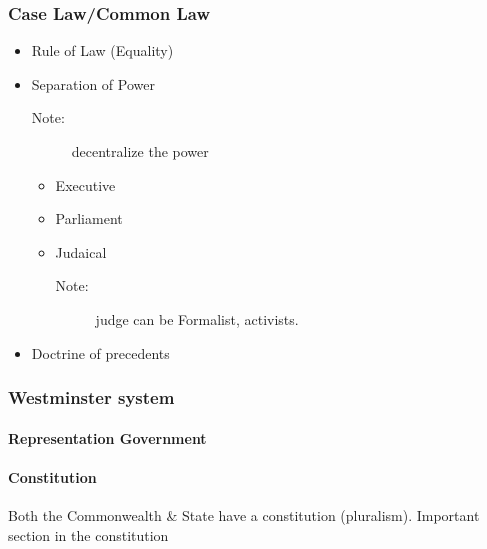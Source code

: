 \subsubsection{Case Law/Common Law}
\begin{itemize}
    \item Rule of Law (Equality)
    \item Separation of Power
        \begin{description}
            \item[Note:] decentralize the power
        \end{description}
        \begin{itemize}
            \item Executive
            \item Parliament
            \item Judaical
                \begin{description}
                    \item[Note:] judge can be Formalist, activists. 
                \end{description}
        \end{itemize}
    \item Doctrine of precedents
\end{itemize}

\subsubsection*{Westminster system}

\paragraph*{Representation Government}


\paragraph*{Constitution}
Both the Commonwealth \& State have a constitution (pluralism). Important section in the constitution

